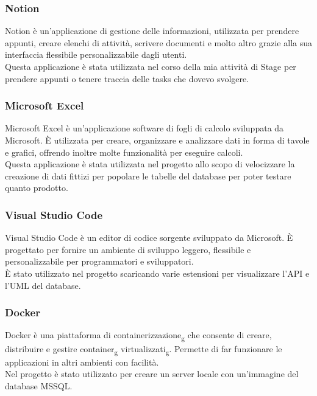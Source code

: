 \subsubsection*{Notion}
Notion è un'applicazione di gestione delle informazioni, utilizzata per prendere appunti, creare elenchi di attività, scrivere documenti e molto altro grazie alla sua interfaccia flessibile personalizzabile dagli utenti.\\
Questa applicazione è stata utilizzata nel corso della mia attività di Stage per prendere appunti o tenere traccia delle tasks che dovevo svolgere.\\ 


\subsubsection*{Microsoft Excel}
Microsoft Excel è un'applicazione software di fogli di calcolo sviluppata da Microsoft. È utilizzata per creare, organizzare e analizzare dati in forma di tavole e grafici, offrendo inoltre molte funzionalità per eseguire calcoli.\\
Questa applicazione è stata utilizzata nel progetto allo scopo di velocizzare la creazione di dati fittizi per popolare le tabelle del database per poter testare quanto prodotto.\\


\subsubsection*{Visual Studio Code}
Visual Studio Code è un editor di codice sorgente sviluppato da Microsoft. È progettato per fornire un ambiente di sviluppo leggero, flessibile e personalizzabile per programmatori e sviluppatori.\\
È stato utilizzato nel progetto scaricando varie estensioni per visualizzare l'API e l'UML del database.\\

\subsubsection*{Docker}
Docker è una piattaforma di containerizzazione\textsubscript{g} che consente di creare, distribuire e gestire container\textsubscript{g} virtualizzati\textsubscript{g}. Permette di far funzionare le applicazioni in altri ambienti con facilità.\\
Nel progetto è stato utilizzato per creare un server locale con un'immagine del database MSSQL.\\

